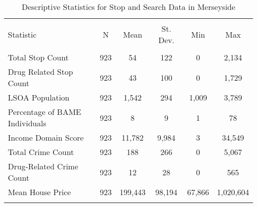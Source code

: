 
\begin{table}[!htbp] \centering 
  \caption{Descriptive Statistics for Stop and Search Data in Merseyside} 
  \label{tab:descriptive_merseyside} 
\begin{tabular}{@{\extracolsep{5pt}}lccccc} 
\\[-1.8ex]\hline 
\hline \\[-1.8ex] 
Statistic & \multicolumn{1}{c}{N} & \multicolumn{1}{c}{Mean} & \multicolumn{1}{c}{St. Dev.} & \multicolumn{1}{c}{Min} & \multicolumn{1}{c}{Max} \\ 
\hline \\[-1.8ex] 
Total Stop Count & 923 & 54 & 122 & 0 & 2,134 \\ 
Drug Related Stop Count & 923 & 43 & 100 & 0 & 1,729 \\ 
LSOA Population & 923 & 1,542 & 294 & 1,009 & 3,789 \\ 
Percentage of BAME Individuals & 923 & 8 & 9 & 1 & 78 \\ 
Income Domain Score & 923 & 11,782 & 9,984 & 3 & 34,549 \\ 
Total Crime Count & 923 & 188 & 266 & 0 & 5,067 \\ 
Drug-Related Crime Count & 923 & 12 & 28 & 0 & 565 \\ 
Mean House Price & 923 & 199,443 & 98,194 & 67,866 & 1,020,604 \\ 
\hline \\[-1.8ex] 
\end{tabular} 
\end{table} 
